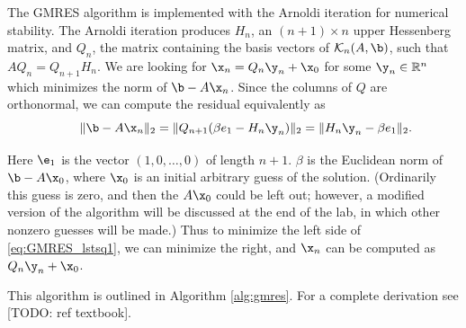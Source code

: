 The GMRES algorithm is implemented with the Arnoldi iteration for numerical stability.  
The Arnoldi iteration produces $H_n$, an $(n+1)\times n$ upper Hessenberg matrix, and $Q_n$, the matrix containing the basis vectors of $\mathcal{K}_n(A, \b)$, such that $AQ_n = Q_{n+1}H_n$.  
We are looking for $\x_n = Q_n \y_n  + \x_0$ for some $\y_n \in \mathbb{R}^n$ which minimizes the norm of $\b - A\x_n$.
Since the columns of $Q$ are orthonormal, we can compute the residual equivalently as
\begin{equation}
\qquad \|\b - A\x_n\|_2 = \|Q_{n+1}(\beta e_1 - H_n \y_n)\|_2 = \|H_n \y_n - \beta e_1\|_2.
\label{eq:GMRES_lstsq1}
\end{equation}

Here $\e_1$ is the vector $(1, 0, \ldots, 0)$ of length $n+1$.  $\beta$ is the Euclidean norm of $\b - A\x_0$, where $\x_0$ is an initial arbitrary guess of the solution.  (Ordinarily this guess is zero, and then the $A\x_0$ could be left out; however, a modified version of the algorithm will be discussed at the end of the lab, in which other nonzero guesses will be made.)  Thus to minimize the left side of \ref{eq:GMRES_lstsq1}, we can minimize the right, and $\x_n $ can be computed as $ Q_n \y_n + \x_0$.

This algorithm is outlined in Algorithm \ref{alg:gmres}.
For a complete derivation see [TODO: ref textbook].

